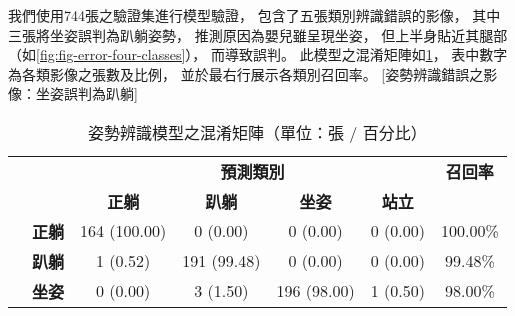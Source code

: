 \documentclass[class=NCU_thesis, crop=false]{standalone}
\begin{document}
我們使用744張之驗證集進行模型驗證，
包含了五張類別辨識錯誤的影像，
其中三張將坐姿誤判為趴躺姿勢，
推測原因為嬰兒雖呈現坐姿，
但上半身貼近其腿部（如\cref{fig:fig-error-four-classes}），
而導致誤判。
此模型之混淆矩陣如\cref{table:table-confusion-matrix-four-classes}，
表中數字為各類影像之張數及比例，
並於最右行展示各類別召回率。
[姿勢辨識錯誤之影像：坐姿誤判為趴躺]
\begin{table}[h]
    \centering
    \caption{姿勢辨識模型之混淆矩陣（單位：張 / 百分比）}
    \label{table:table-confusion-matrix-four-classes}
    \begin{tabular}{|cc|cccc|c|}
        \hline
        \multicolumn{2}{|c|}{}                                                                                              & \multicolumn{4}{c|}{\textbf{預測類別}}                                                                                                                                                                             & \multicolumn{1}{c|}{\textbf{召回率}} \\ \cline{3-6} 
        \multicolumn{2}{|c|}{\multirow{-2}{*}{}}                                                                            & \multicolumn{1}{c|}{\textbf{正躺}}                       & \multicolumn{1}{c|}{\textbf{趴躺}}                      & \multicolumn{1}{c|}{\textbf{坐姿}}                      & \textbf{站立}                       & \multicolumn{1}{c|}{}                \\ \hline
        \multicolumn{1}{|c|}{}                                                                              & \textbf{正躺} & \multicolumn{1}{c|}{{\color[HTML]{FE0000} 164 (100.00)}} & \multicolumn{1}{c|}{0 (0.00)}                           & \multicolumn{1}{c|}{0 (0.00)}                           & 0 (0.00)                            & 100.00\%                             \\ \cline{2-7} 
        \multicolumn{1}{|c|}{}                                                                              & \textbf{趴躺} & \multicolumn{1}{c|}{1 (0.52)}                            & \multicolumn{1}{c|}{{\color[HTML]{FE0000} 191 (99.48)}} & \multicolumn{1}{c|}{0 (0.00)}                           & 0 (0.00)                            & 99.48\%                              \\ \cline{2-7} 
        \multicolumn{1}{|c|}{}                                                                              & \textbf{坐姿} & \multicolumn{1}{c|}{0 (0.00)}                            & \multicolumn{1}{c|}{3 (1.50)}                           & \multicolumn{1}{c|}{{\color[HTML]{FE0000} 196 (98.00)}} & 1 (0.50)                            & 98.00\%                              \\ \cline{2-7} 

\end{tabular}
\end{table}
\end{document}

